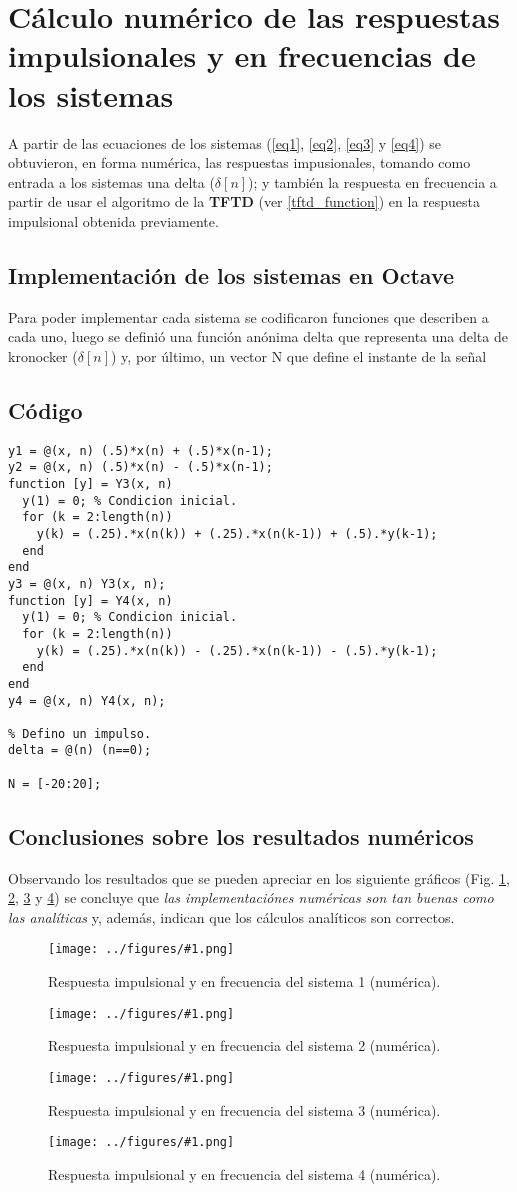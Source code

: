 \documentclass[letterpaper, 10 pt, conference]{ieeeconf}  %
\newcommand{\image}[2] {
  \begin{figure}[H]
    \centering
    \texttt{[image: ../figures/\#1.png]}
    \caption{#2}
    \label{fig:#1}
  \end{figure}
}
\begin{document}
\section{C\'alculo num\'erico de las respuestas impulsionales y en frecuencias de los sistemas}
A partir de las ecuaciones de los sistemas (\ref{eq1}, \ref{eq2}, \ref{eq3} y \ref{eq4}) se obtuvieron, en forma num\'erica, las respuestas impusionales, tomando como entrada a los sistemas una delta ($\delta[n]$); y tambi\'en la respuesta en frecuencia a partir de usar el algoritmo de la \textbf{TFTD} (ver \ref{tftd_function}) en la respuesta impulsional obtenida previamente.

\subsection{Implementaci\'on de los sistemas en Octave}
Para poder implementar cada sistema se codificaron funciones que describen a cada uno, luego se defini\'o una funci\'on an\'onima delta que representa una delta de kronocker ($\delta[n]$) y, por \'ultimo, un vector N que define el instante de la señal

\subsection{C\'odigo}
\begin{lstlisting}[style=Matlab-editor]
y1 = @(x, n) (.5)*x(n) + (.5)*x(n-1);
y2 = @(x, n) (.5)*x(n) - (.5)*x(n-1);
function [y] = Y3(x, n)
  y(1) = 0; % Condicion inicial.
  for (k = 2:length(n))
    y(k) = (.25).*x(n(k)) + (.25).*x(n(k-1)) + (.5).*y(k-1);
  end
end
y3 = @(x, n) Y3(x, n);
function [y] = Y4(x, n)
  y(1) = 0; % Condicion inicial.
  for (k = 2:length(n))
    y(k) = (.25).*x(n(k)) - (.25).*x(n(k-1)) - (.5).*y(k-1);
  end
end
y4 = @(x, n) Y4(x, n);

% Defino un impulso.
delta = @(n) (n==0);

N = [-20:20];

\end{lstlisting}

\subsection{Conclusiones sobre los resultados num\'ericos}
Observando los resultados que se pueden apreciar en los siguiente gr\'aficos (Fig. \ref{fig:num_resp_sist_1}, \ref{fig:num_resp_sist_2}, \ref{fig:num_resp_sist_3} y \ref{fig:num_resp_sist_4}) se concluye que \textit{las implementaci\'ones num\'ericas son tan buenas como las anal\'iticas} y, adem\'as, indican que los c\'alculos anal\'iticos son correctos.
\image{num_resp_sist_1}{Respuesta impulsional y en frecuencia del sistema 1 (num\'erica).}
\image{num_resp_sist_2}{Respuesta impulsional y en frecuencia del sistema 2 (num\'erica).}
\image{num_resp_sist_3}{Respuesta impulsional y en frecuencia del sistema 3 (num\'erica).}
\image{num_resp_sist_4}{Respuesta impulsional y en frecuencia del sistema 4 (num\'erica).}
\end{document}
